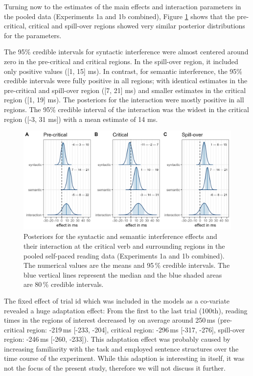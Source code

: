 \documentclass[review,preprint,12pt,authoryear,floatsintext]{elsarticle}
\begin{document}
Turning now to the estimates of the main effects and interaction parameters in the pooled data (Experiments 1a and 1b combined), Figure \ref{fig:spr_posteriors} shows that the pre-critical, critical and spill-over regions showed very similar posterior distributions for the parameters. {The 95\% credible intervals for syntactic interference were almost centered around zero in the pre-critical and critical regions. In the spill-over region, it included only positive values ([1, 15] ms). In contrast, for semantic interference, the 95\% credible intervals were fully positive in all regions; with identical estimates in the pre-critical and spill-over region ([7, 21] ms) and smaller estimates in the critical region ([1, 19] ms). The posteriors for the interaction were mostly positive in all regions. The 95\% credible interval of the interaction was the widest in the critical region ([-3, 31 ms]) with a mean estimate of 14 ms.

\begin{figure}[ht]
    \caption{Posteriors for the syntactic and semantic interference effects and their interaction at the critical verb and surrounding regions in the pooled self-paced reading data (Experiments 1a and 1b combined). The numerical values are the means and 95\,\% credible intervals. The blue vertical lines represent the median and the blue shaded areas are 80\,\% credible intervals.}
    \label{fig:spr_posteriors}
    \centering
    \includegraphics[width=\textwidth]{posteriors_spr_pooled_774.png}
\end{figure}
}\label{SPR_results}

{The fixed effect of trial id which was included in the models as a co-variate revealed a huge adaptation effect: From the first to the last trial (100th), reading times in the regions of interest decreased by on average around 250\,ms (pre-critical region: -219\,ms [-233, -204], critical region: -296\,ms [-317, -276], spill-over region: -246\,ms [-260, -233]). This adaptation effect was probably caused by increasing familiarity with the task and employed sentence structures over the time course of the experiment. While this adaption is interesting in itself, it was not the focus of the present study, therefore we will not discuss it further.}\label{adaptation}
\end{document}
